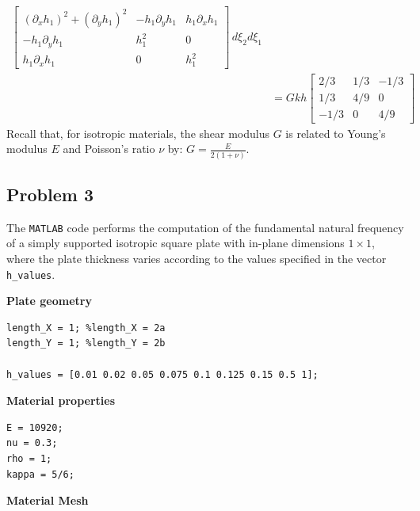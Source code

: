 \documentclass[12pt]{article}
\begin{document}
\begin{align*}
\begin{bmatrix}
                                                       (\partial_x h_1)^2 + (\partial_y h_1)^2 & -h_1 \partial_y h_1 & h_1 \partial_x h_1 \\
                                                       -h_1 \partial_y h_1                     & h_1^2               & 0                  \\
                                                       h_1 \partial_x h_1                      & 0                   & h_1^2
                                                   \end{bmatrix}   \, d\xi_2d\xi_1                                                                                                                                                                            \\
                      & = Gkh\begin{bmatrix}
                                 2/3  & 1/3 & -1/3 \\
                                 1/3  & 4/9 & 0    \\
                                 -1/3 & 0   & 4/9
                             \end{bmatrix}
\end{align*}
Recall that, for isotropic materials, the shear modulus $G$ is related to Young’s modulus $E$ and Poisson’s ratio $\nu$ by: $G = \frac{E}{2(1 + \nu)}$.


\subsection*{Problem 3}
The \texttt{MATLAB} code performs the computation of the fundamental natural frequency of a simply supported isotropic square plate with in-plane dimensions $1 \times 1$, where the plate thickness varies according to the values specified in the vector \texttt{h\_values}.

\textbf{Plate geometry}
\begin{verbatim}
length_X = 1; %length_X = 2a
length_Y = 1; %length_Y = 2b  

h_values = [0.01 0.02 0.05 0.075 0.1 0.125 0.15 0.5 1];
\end{verbatim}
\textbf{Material properties}
\begin{verbatim}
E = 10920;
nu = 0.3; 
rho = 1;
kappa = 5/6; 
\end{verbatim}
\textbf{Material Mesh}
\end{document}
